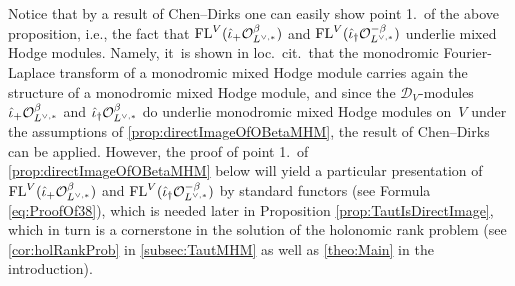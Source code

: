 \documentclass[11pt]{article}
\newcommand{\ie}{i.e.,\xspace}
\newcommand{\cD}{\mathscr{D}}
\DeclareMathOperator{\FL}{\textup{FL}}
\begin{document}
\begin{rmk}
Notice that by a result of Chen--Dirks \cite[Th.\,1.4]{CD23} one can easily show point 1.\ of the above proposition, \ie the fact that $\FL^V(\hat\iota_+ \O_{L^{\vee,*}}^\beta)$ and $\FL^V(\hat\iota_\dag \O_{L^{\vee,*}}^{-\beta})$
underlie mixed Hodge modules. Namely, it~is shown in loc.\ cit.\ that the monodromic Fourier-Laplace transform of a monodromic mixed Hodge module carries again the structure of a monodromic mixed Hodge module, and since the $\cD_V$\nobreakdash-mod\-ules $\hat\iota_+ \mathcal{O}_{L^{\vee,*}}^\beta$ and $\hat\iota_\dag \mathcal{O}_{L^{\vee,*}}^\beta$ do underlie monodromic mixed Hodge modules on~$V$ under the assumptions of \cref{prop:directImageOfOBetaMHM}, the result of Chen--Dirks can be applied. However, the proof of point 1.\ of \cref{prop:directImageOfOBetaMHM} below will yield a particular presentation of $\FL^V(\hat\iota_+ \O_{L^{\vee,*}}^\beta)$ and $\FL^V(\hat\iota_\dag \O_{L^{\vee,*}}^{-\beta})$ by standard functors (see Formula \eqref{eq:ProofOf38}), which
is needed later in Proposition \ref{prop:TautIsDirectImage}, which in turn is a cornerstone in the solution of the holonomic rank problem (see \cref{cor:holRankProb} in \cref{subsec:TautMHM} as well as \cref{theo:Main} in the introduction).
\end{rmk}
\end{document}
